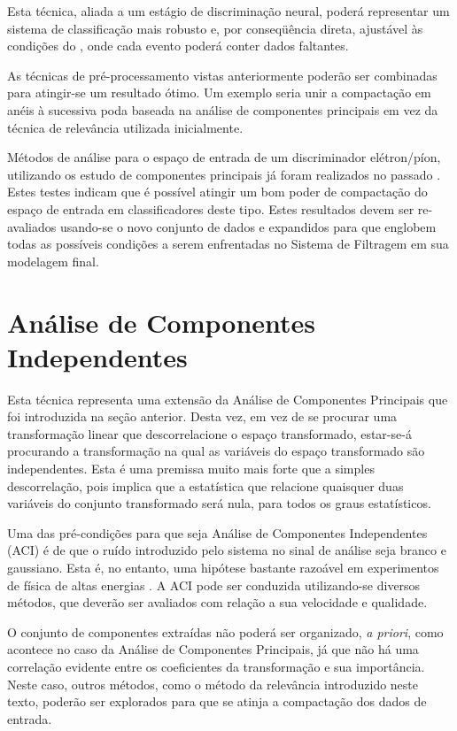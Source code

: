 Esta técnica, aliada a um estágio de discriminação neural, poderá representar
um sistema de classificação mais robusto e, por conseqüência direta, ajustável
às condições do , onde cada evento poderá conter dados faltantes.

As técnicas de pré-processamento vistas anteriormente poderão ser combinadas
para atingir-se um resultado ótimo. Um exemplo seria unir a compactação em
anéis à sucessiva poda baseada na análise de componentes principais em vez da
técnica de relevância utilizada inicialmente.

Métodos de análise para o espaço de entrada de um discriminador elétron/píon,
utilizando os estudo de componentes principais já foram realizados no passado
\cite{vassali}. Estes testes indicam que é possível atingir um bom poder de
compactação do espaço de entrada em classificadores deste tipo. Estes
resultados devem ser re-avaliados usando-se o novo conjunto de dados e
expandidos para que englobem todas as possíveis condições a serem enfrentadas
no Sistema de Filtragem em sua modelagem final.

\section{Análise de Componentes Independentes}

Esta técnica representa uma extensão da Análise de Componentes Principais
\cite{oja-ica} que foi introduzida na seção anterior. Desta vez, em vez de
se procurar uma transformação linear que descorrelacione o espaço
transformado, estar-se-á procurando a transformação na qual as variáveis do
espaço transformado são independentes. Esta é uma premissa muito mais forte
que a simples descorrelação, pois implica que a estatística que relacione
quaisquer duas variáveis do conjunto transformado será nula, para todos os
graus estatísticos.

Uma das pré-condições para que seja Análise de Componentes Independentes (ACI)
é de que o ruído introduzido pelo sistema no sinal de análise seja branco e
gaussiano. Esta é, no entanto, uma hipótese bastante razoável em experimentos
de física de altas energias \cite{knoll, leo}. A ACI pode ser conduzida
utilizando-se diversos métodos, que deverão ser avaliados com relação a sua
velocidade e qualidade.

O conjunto de componentes extraídas não poderá ser organizado, \textit{a
priori}, como acontece no caso da Análise de Componentes Principais, já que
não há uma correlação evidente entre os coeficientes da transformação e sua
importância. Neste caso, outros métodos, como o método da relevância
introduzido neste texto, poderão ser explorados para que se atinja a
compactação dos dados de entrada.

